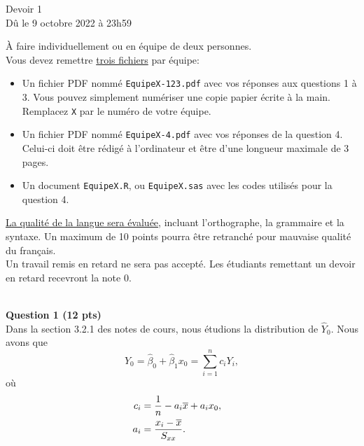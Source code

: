 \documentclass[letter, 11pt]{article}
\begin{document}
\vspace*{0.05 in}
\begin{center}
{\Large Devoir 1 \\
Dû le 9 octobre 2022 à 23h59}
\end{center}
\vspace*{0.1 in}


À faire individuellement ou en équipe de deux personnes. \\

Vous devez remettre \underline{trois fichiers} par équipe:
\begin{itemize}
\item Un fichier PDF nommé {\tt EquipeX-123.pdf} avec vos réponses aux questions 1 à 3. Vous pouvez simplement numériser une copie papier écrite à la main. Remplacez {\tt X} par le numéro de votre équipe.
\item Un fichier PDF nommé {\tt EquipeX-4.pdf} avec vos réponses de la question 4. Celui-ci doit être rédigé à l'ordinateur et être d'une longueur maximale de 3 pages. %
\item Un document {\tt EquipeX.R}, ou {\tt EquipeX.sas} avec les codes utilisés pour la question 4.\\
\end{itemize}


\underline{La qualité de la langue sera évaluée}, incluant l'orthographe, la grammaire et la syntaxe. Un maximum de 10 points pourra être retranché pour mauvaise qualité du français. \\

Un travail remis en retard ne sera pas accepté. Les étudiants remettant un devoir en retard recevront la note 0.

\underline{\hspace{17cm}}\\


\textbf{Question 1 (12 pts)}  \\

Dans la section 3.2.1 des notes de cours, nous étudions la distribution de $\widehat{Y}_0$. Nous avons que
$$   \widehat{Y}_0 = \widehat{\beta}_0 + \widehat{\beta}_1 x_0 = \sum_{i=1}^n c_i Y_i, $$
où 
\begin{align*}
    c_i &= \frac{1}{n} - a_i \overline{x} + a_i x_0, \cr
    a_i &= \frac{x_i-\overline{x}}{S_{xx}}.
\end{align*}
\end{document}
